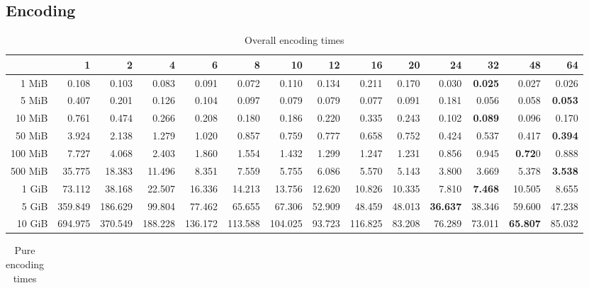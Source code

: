 
\subsection{Encoding}
\begin{centering}
\begin{table}[!h]
	\caption{Overall encoding times}
	\begin{tabular}{rrrrrrrrrrrrrr}
		\toprule
		\diagbox[width=7em]{Size}{Threads} &      1  &      2  &      4  &      6  &      8  &      10 &     12 &      16 &     20 &     24 &     32 &     48 &     64 \\
		\midrule
		1 MiB   &   0.108 &   0.103 &   0.083 &   0.091 &   0.072 &   0.110 &  0.134 &   0.211 &  0.170 &  0.030 &  \textbf{0.025} &  0.027 &  0.026 \\
		5 MiB   &   0.407 &   0.201 &   0.126 &   0.104 &   0.097 &   0.079 &  0.079 &   0.077 &  0.091 &  0.181 &  0.056 &  0.058 &  \textbf{0.053} \\
		10 MiB  &   0.761 &   0.474 &   0.266 &   0.208 &   0.180 &   0.186 &  0.220 &   0.335 &  0.243 &  0.102 &  \textbf{0.089} &  0.096 &  0.170 \\
		50 MiB  &   3.924 &   2.138 &   1.279 &   1.020 &   0.857 &   0.759 &  0.777 &   0.658 &  0.752 &  0.424 &  0.537 &  0.417 &  \textbf{0.394} \\
		100 MiB &   7.727 &   4.068 &   2.403 &   1.860 &   1.554 &   1.432 &  1.299 &   1.247 &  1.231 &  0.856 &  0.945 &  \textbf{0.72}0 &  0.888 \\
		500 MiB &  35.775 &  18.383 &  11.496 &   8.351 &   7.559 &   5.755 &  6.086 &   5.570 &  5.143 &  3.800 &  3.669 &  5.378 &  \textbf{3.538} \\
		1 GiB   &  73.112 &  38.168 &  22.507 &  16.336 &  14.213 &  13.756 & 12.620 &  10.826 & 10.335 &  7.810 &  \textbf{7.468} & 10.505 &  8.655 \\
		5 GiB   & 359.849 & 186.629 &  99.804 &  77.462 &  65.655 &  67.306 & 52.909 &  48.459 & 48.013 & \textbf{36.637} & 38.346 & 59.600 & 47.238 \\
		10 GiB  & 694.975 & 370.549 & 188.228 & 136.172 & 113.588 & 104.025 & 93.723 & 116.825 & 83.208 & 76.289 & 73.011 & \textbf{65.807} & 85.032 \\
		\bottomrule
	\end{tabular}
\end{table}
\begin{table}[!h]
	\caption{Pure encoding times}
	\begin{tabular}{rrrrrrrrrrrrrr}
		\toprule

\end{tabular}
\end{table}
\end{centering}
